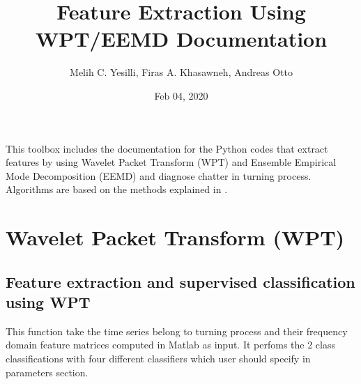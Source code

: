 \documentclass[letterpaper,10pt,english]{sphinxmanual}
\title{Feature Extraction Using WPT/EEMD Documentation}
\date{Feb 04, 2020}
\author{Melih C. Yesilli, Firas A. Khasawneh, Andreas Otto}
\begin{document}
\pagestyle{empty}
\sphinxmaketitle
\pagestyle{plain}
\sphinxtableofcontents
\pagestyle{normal}
\label{\detokenize{index::doc}}


This toolbox includes the documentation for the Python codes that extract features by using Wavelet Packet Transform (WPT)
and Ensemble Empirical Mode Decomposition (EEMD) and diagnose chatter in turning process. Algorithms are based on the methods
explained in .


\chapter{Wavelet Packet Transform (WPT)}
\label{\detokenize{WPT:module-WPT_Feature_Extraction}}\label{\detokenize{WPT:wavelet-packet-transform-wpt}}\label{\detokenize{WPT::doc}}

\section{Feature extraction and supervised classification using WPT}
\label{\detokenize{WPT:feature-extraction-and-supervised-classification-using-wpt}}
This function take the time series belong to turning process and
their frequency domain feature matrices computed in Matlab as input. It perfoms 
the 2 class classifications with four different classifiers which
user should specify in parameters section.
\end{document}
